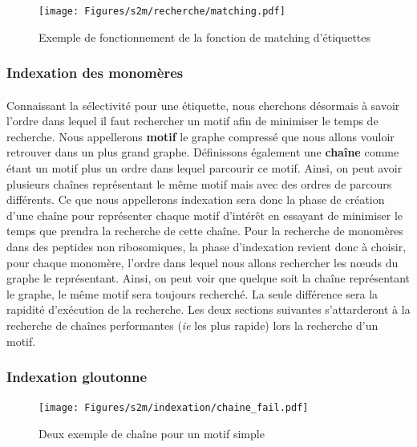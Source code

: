 \documentclass[12pt,french,twoside]{report}
\begin{document}
\begin{figure}
  \texttt{[image: Figures/s2m/recherche/matching.pdf]}
  \caption{\label{label_matching}Exemple de fonctionnement de la fonction de matching d'étiquettes}
\end{figure}

\subsubsection{Indexation des monomères}

\label{index_p}

\paragraph{}Connaissant la sélectivité pour une étiquette, nous cherchons désormais à savoir l'ordre dans lequel il faut rechercher
un motif afin de minimiser le temps de recherche.
Nous appellerons \textbf{motif} le graphe compressé que nous allons vouloir retrouver dans un plus
grand graphe. Définissons également une \textbf{chaîne} comme étant un motif plus un ordre dans lequel parcourir ce motif. Ainsi,
on peut avoir plusieurs chaînes représentant le même motif mais avec des ordres de parcours différents. Ce que nous appellerons
indexation sera donc la phase de création d'une chaîne pour représenter chaque motif d'intérêt en essayant de minimiser le temps
que prendra la recherche de cette chaîne. Pour la recherche de monomères dans
des peptides non ribosomiques, la phase d'indexation revient donc à choisir, pour chaque monomère, l'ordre dans lequel nous allons
rechercher les n\oe{}uds du graphe le représentant. Ainsi, on peut voir que quelque soit la chaîne représentant le graphe, le même
motif sera toujours recherché. La seule différence sera la rapidité d'exécution de la recherche. Les deux sections suivantes
s'attarderont à la recherche de chaînes performantes (\textit{ie} les plus rapide) lors la recherche d'un motif.


\subsubsection{Indexation gloutonne}

\begin{figure}
  \texttt{[image: Figures/s2m/indexation/chaine\_fail.pdf]}
  \caption{\label{chaine_fail}Deux exemple de chaîne pour un motif simple}
\end{figure}
\end{document}
